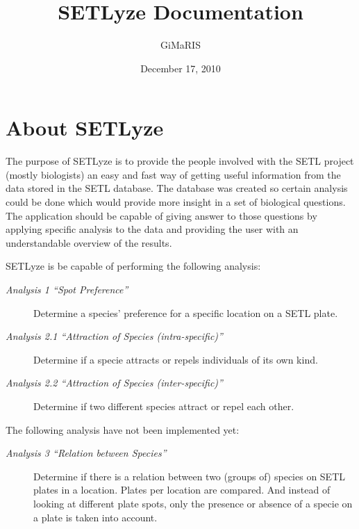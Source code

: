 \documentclass[letterpaper,10pt,english]{sphinxmanual}
\title{SETLyze Documentation}
\date{December 17, 2010}
\author{GiMaRIS}
\begin{document}
\maketitle
\tableofcontents
{}\label{index::doc}



\chapter{About SETLyze}
\label{index:welcome-to-setlyze-s-documentation}\label{index:about-setlyze}
The purpose of SETLyze is to provide the people involved with the SETL
project (mostly biologists) an easy and fast way of getting useful information from
the data stored in the SETL database. The database was created so certain
analysis could be done which would provide more insight in a set of
biological questions. The application should be capable of giving answer
to those questions by applying specific analysis to the data and
providing the user with an understandable overview of the results.

SETLyze is be capable of performing the following analysis:
\begin{description}
\item[{\emph{Analysis 1 ``Spot Preference''}}] \leavevmode
Determine a species’ preference for a specific location on a SETL
plate.

\item[{\emph{Analysis 2.1 ``Attraction of Species (intra-specific)''}}] \leavevmode
Determine if a specie attracts or repels individuals of its own kind.

\item[{\emph{Analysis 2.2 ``Attraction of Species (inter-specific)''}}] \leavevmode
Determine if two different species attract or repel each other.

\end{description}

The following analysis have not been implemented yet:
\begin{description}
\item[{\emph{Analysis 3 ``Relation between Species''}}] \leavevmode
Determine if there is a relation between two (groups of) species on
SETL plates in a location. Plates per location are compared. And
instead of looking at different plate spots, only the presence or
absence of a specie on a plate is taken into account.

\end{description}
\end{document}
